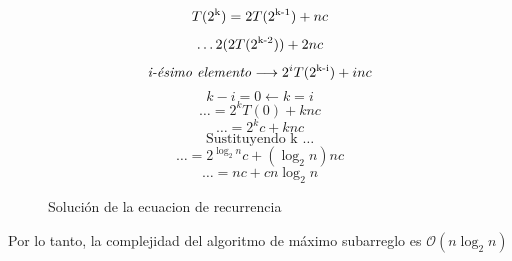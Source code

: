 \documentclass[12pt,twoside]{article}
\begin{document}
\begin{figure}[h]
    \centering
    \begin{equation}
        T(2\textsuperscript{k}) = 2T(2\textsuperscript{k-1}) + nc
    \end{equation}
    \begin{equation}
        \dots 2(2T(2\textsuperscript{k-2})) + 2nc
    \end{equation}
    \begin{equation}
        \text{\textit{i-\'esimo elemento}} \longrightarrow 2^iT(2\textsuperscript{k-i}) + inc
    \end{equation}
    \begin{equation}
        k - i = 0 \longleftarrow k = i
    \end{equation}
    \begin{equation}
        \dots = 2^kT(0) + knc
    \end{equation}
    \begin{equation}
        \dots = 2^kc + knc
    \end{equation}
    \begin{equation}
        \text{Sustituyendo k }\dots
    \end{equation}
    \begin{equation}
        \dots = 2^{\log_2{n}} c + (\log_2{n})nc
    \end{equation}
    \begin{equation}
        \dots = nc + cn\log_2{n}
    \end{equation}
    \caption{Soluci\'on de la ecuacion de recurrencia}
    \label{eq:eq_rec}
\end{figure}
Por lo tanto, la complejidad del algoritmo de m\'aximo subarreglo es $\mathcal{O}(n\log_2{n})$
\newpage
\vfill
\clearpage
\end{document}
